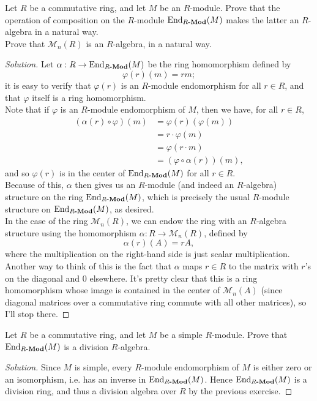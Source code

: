 \documentclass[12pt]{article}
\newenvironment{problem}[2][Problem]{\begin{trivlist}
\item[\hskip \labelsep {\bfseries #1}\hskip \labelsep {\bfseries #2.}]}{\end{trivlist}}
\newcommand{\catname}[1]{\normalfont\textbf{#1}}
\newcommand{\End}{\text{End}}
\newcommand{\Endmod}[2]{\End_{#1\catname{-Mod}}(#2)}
\newenvironment{solution}
  {\renewcommand\qedsymbol{$\blacksquare$}\begin{proof}[Solution]}
{\end{proof}}
\theoremstyle{remark}
\begin{document}
\begin{problem}{5.9}
  Let $R$ be a commutative ring, and let $M$ be an $R$-module.
  Prove that the operation of composition on the $R$-module $\Endmod{R}{M}$
  makes the latter an $R$-algebra in a natural way.\\
  \indent Prove that $\mathcal{M}_n(R)$ is an $R$-algebra, in a natural way.
\end{problem}
\begin{solution}
  Let $\alpha:R\to\Endmod{R}{M}$ be the ring homomorphism defined by
  \begin{equation*}
    \varphi(r)(m) = rm;
  \end{equation*}
  it is easy to verify that $\varphi(r)$ is an $R$-module endomorphism for
  all $r\in R$, and that $\varphi$ itself is a ring homomorphism. \\
  \indent Note that if $\varphi$ is an $R$-module endomorphism of $M$,
  then we have, for all $r\in R$,
  \begin{align*}
    (\alpha(r)\circ\varphi)(m) &= \varphi(r)(\varphi(m))\\
    &= r\cdot\varphi(m)\\
    &= \varphi(r\cdot m)\\
    &= (\varphi\circ\alpha(r))(m),
  \end{align*}
  and so $\varphi(r)$ is in the center of $\Endmod{R}{M}$ for all $r\in R$. \\
  Because of this, $\alpha$ then gives us an $R$-module (and indeed
  an $R$-algebra) structure on the ring $\Endmod{R}{M}$, which is precisely
  the usual $R$-module structure on $\Endmod{R}{M}$, as desired. \\
  \indent In the case of the ring $\mathcal{M}_n(R)$, we can endow the ring
  with an $R$-algebra structure using the homomorphism 
  $\alpha:R\to\mathcal{M}_n(R)$, defined by
  \begin{equation*}
    \alpha(r)(A) = rA,
  \end{equation*}
  where the multiplication on the right-hand side is just scalar 
  multiplication.
  Another way to think of this is the fact that $\alpha$ maps $r\in R$
  to the matrix with $r$'s on the diagonal and $0$ elsewhere.
  It's pretty clear that this is a ring homomorphism whose image is contained
  in the center of $\mathcal{M}_n(A)$ (since diagonal matrices over a
  commutative ring commute with all other matrices), so I'll stop there.
\end{solution}

\begin{problem}{5.10}
  Let $R$ be a commutative ring, and let $M$ be a simple $R$-module.
  Prove that $\Endmod{R}{M}$ is a division $R$-algebra.
\end{problem}
\begin{solution}
  Since $M$ is simple, every $R$-module endomorphism of $M$
  is either zero or an isomorphism, i.e. has an inverse in 
  $\Endmod{R}{M}$.
  Hence $\Endmod{R}{M}$ is a division ring, and thus a division
  algebra over $R$ by the previous exercise.
\end{solution}
\end{document}
